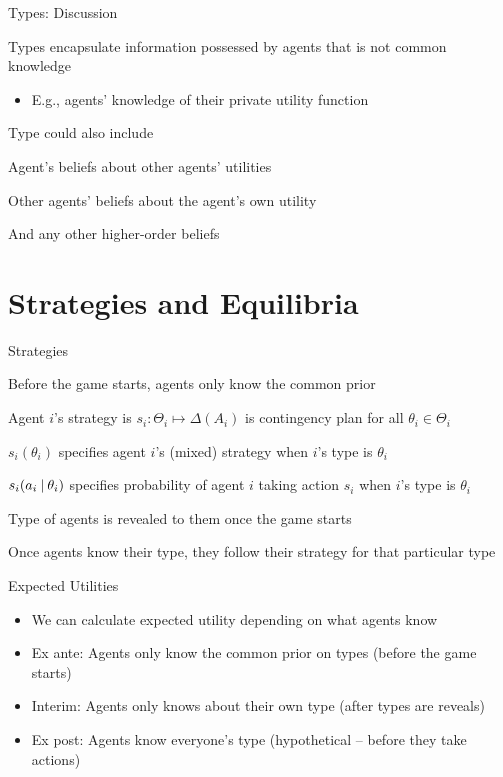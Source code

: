 \documentclass[11pt,aspectratio=169,handout]{beamer}
\begin{document}
  
  \begin{frame}{Types: Discussion}
   \begin{itemizes}
    \item Types encapsulate information possessed by agents that is \alert{not} common knowledge
    \begin{itemize}
     \item E.g., agents' knowledge of their private utility function
    \end{itemize}
    \item Type could also include
    \begin{itemizes}[0.7em]
     \item Agent's beliefs about other agents' utilities
     \item Other agents' beliefs about the agent's own utility
     \item And any other higher-order beliefs
    \end{itemizes}
   \end{itemizes}
  \end{frame}
  
 \section{Strategies and Equilibria}

  \begin{frame}{Strategies}
   \begin{itemizes}[1.2em]
    \item \alert{Before} the game starts, agents only know the common prior
    \item Agent $i$'s strategy is $s_i: \Theta_i \mapsto \Delta(A_i)$ is \alert{contingency plan} for all $\theta_i \in \Theta_i$
    \item $s_i(\theta_i)$ specifies agent $i$'s (mixed) strategy when $i$'s type is $\theta_i$
    \item $s_i(a_i \:\vert\: \theta_i)$ specifies probability of agent $i$ taking action $s_i$ when $i$'s type is $\theta_i$
    \item Type of agents is \alert{revealed} to them once the game \alert{starts}
    \item Once agents know their type, they follow their strategy for that particular type
   \end{itemizes}
  \end{frame}
  
  
  \begin{frame}{Expected Utilities}
   \begin{itemize}[<+->]
   \setlength{\itemsep}{1.5em}
    \item We can calculate expected utility depending on what agents know
    \item \alert{Ex ante}: Agents only know the common prior on types (before the game starts)
    \item \alert{Interim}: Agents only knows about their own type (after types are reveals)
    \item \alert{Ex post}: Agents know everyone's type (hypothetical -- before they take actions)
   \end{itemize}
  \end{frame}
\end{document}
